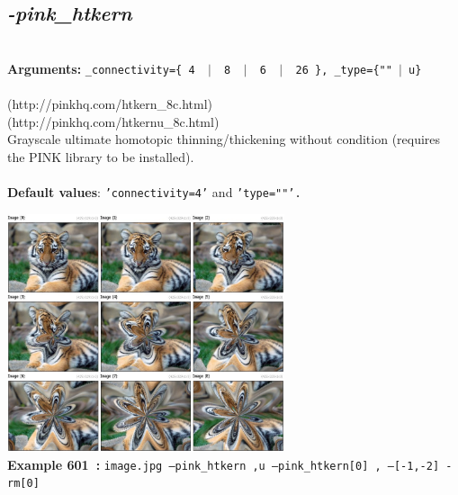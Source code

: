 \documentclass[a4paper,11pt,twoside]{book}
\begin{document}
\subsection{\emph{-pink\_htkern} }\vspace*{-0.5em}
~\\\textbf{Arguments: } 
{\small \texttt{\_connectivity=\{ 4 ~$|$~ 8 ~$|$~ 6 ~$|$~ 26 \}, \_type=\{""~$|$~u\}}}\\~\\
(http://pinkhq.com/htkern\_8c.html)
~\\(http://pinkhq.com/htkernu\_8c.html)
~\\Grayscale ultimate homotopic thinning/thickening without condition (requires the PINK library to be installed).
~\\~\\\textbf{Default values}: {\small \texttt{'connectivity=4'} and \texttt{'type=""'.}}
\begin{center}\includegraphics[keepaspectratio=true,height=7cm,width=\textwidth]{img/gmic_def601.jpg}\\
{\footnotesize \textbf{Example 601~:} \texttt{image.jpg --pink\_htkern ,u --pink\_htkern[0] , ---[-1,-2] -rm[0]}}
\end{center}
\end{document}
